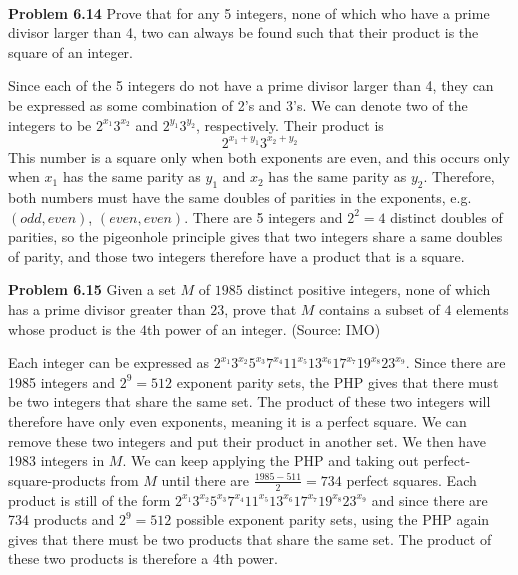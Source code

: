 \documentclass[11pt]{scrartcl}
\DeclarePairedDelimiter
\begin{document}
\\
\begin{tcolorbox}
\textbf{Problem 6.14} Prove that for any 5 integers, none of which who have a prime divisor larger than 4, two can always be found such that their product is the square of an integer. 
\end{tcolorbox}
\noindent 
Since each of the 5 integers do not have a prime divisor larger than 4, they can be expressed as some combination of 2's and 3's. We can denote two of the integers to be $2^{x_1}3^{x_2}$ and $2^{y_1}3^{y_2}$, respectively. Their product is $$2^{{x_{1}}+{y_{1}}}3^{{x_{2}}+{y_{2}}}$$
This number is a square only when both exponents are even, and this occurs only when $x_1$ has the same parity as $y_1$ and $x_2$ has the same parity as $y_2$. Therefore, both numbers must have the same doubles of parities in the exponents, e.g. $(odd, even)$, $(even, even)$. There are 5 integers and $2^2=4$ distinct doubles of parities, so the pigeonhole principle gives that two integers share a same doubles of parity, and those two integers therefore have a product that is a square. 
\\
\begin{tcolorbox}
\textbf{Problem 6.15} Given a set $M$ of $1985$ distinct positive integers, none of which has a prime divisor greater than $23$, prove that $M$ contains a subset of $4$ elements whose product is the $4$th power of an integer. (Source: IMO)
\end{tcolorbox}
\noindent 
Each integer can be expressed as $2^{x_1}3^{x_2}5^{x_3}7^{x_4}11^{x_5}13^{x_6}17^{x_7}19^{x_8}23^{x_9}$. Since there are 1985 integers and $2^9=512$ exponent parity sets, the PHP gives that there must be two integers that share the same set. The product of these two integers will therefore have only even exponents, meaning it is a perfect square. We can remove these two integers and put their product in another set. We then have 1983 integers in $M$. We can keep applying the PHP and taking out perfect-square-products from $M$ until there are $\frac{1985-511}{2}=734$ perfect squares. Each product is still of the form $2^{x_1}3^{x_2}5^{x_3}7^{x_4}11^{x_5}13^{x_6}17^{x_7}19^{x_8}23^{x_9}$ and since there are 734 products and $2^9=512$ possible exponent parity sets, using the PHP again gives that there must be two products that share the same set. The product of these two products is therefore a 4th power. 
\end{document}
